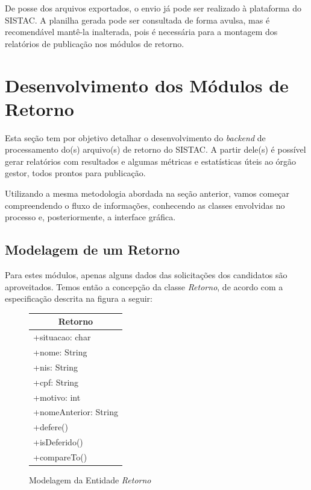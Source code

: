 \documentclass[
	12pt,			%
	openright,		%
	oneside,	
	a4paper,		%
	english,		%
	brazil			%
]{abntex2/abntex2}  %
\begin{document}
				De posse dos arquivos exportados, o envio já pode ser realizado à plataforma do SISTAC. A planilha gerada pode ser consultada de forma avulsa, mas é recomendável mantê-la inalterada, pois é necessária para a montagem dos relatórios de publicação nos módulos de retorno.

		\section{Desenvolvimento dos Módulos de Retorno}
	
			Esta seção tem por objetivo detalhar o desenvolvimento do \textit{backend} de processamento do(s) arquivo(s) de retorno do SISTAC. A partir dele(s) é possível gerar relatórios com resultados e algumas métricas e estatísticas úteis ao órgão gestor, todos prontos para publicação.
	
			Utilizando a mesma metodologia abordada na seção anterior, vamos começar compreendendo o fluxo de informações, conhecendo as classes envolvidas no processo e, posteriormente, a interface gráfica.
	
			\subsection{Modelagem de um Retorno}
	
				Para estes módulos, apenas alguns dados das solicitações dos candidatos são aproveitados. Temos então a concepção da classe \textit{Retorno}, de acordo com a especificação descrita na figura a seguir:
	
				\begin{figure}[ht]
					\begin{center}
						
						\caption{Modelagem da Entidade \textit{Retorno}}
							
						\begin{tabular}{|l|}
							\hline
							\multicolumn{1}{|c|}{\textbf{Retorno}} \\ \hline
							+situacao: char                        \\
							+nome: String                          \\
							+nis: String                           \\
							+cpf: String                           \\
							+motivo: int                           \\
							+nomeAnterior: String                  \\ \hline
							+defere()                              \\
							+isDeferido()                          \\
							+compareTo()                           \\ \hline
						\end{tabular}
						
					\end{center}
				\end{figure}
	
\end{document}
